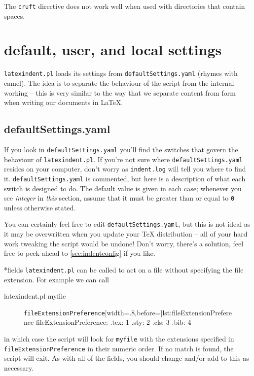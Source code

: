 \documentclass[10pt]{article}
\begin{document}
The \texttt{cruft} directive does not work well when used with
directories that contain spaces.

\section{default, user, and local settings}\label{sec:defuseloc}
\texttt{latexindent.pl} loads its settings from \texttt{defaultSettings.yaml}
(rhymes with camel). The idea is to separate the behaviour of the script
from the internal working -- this is very similar to the way that we separate content
from form when writing our documents in \LaTeX.

\subsection{defaultSettings.yaml}
If you look in \texttt{defaultSettings.yaml} you'll find the switches
that govern the behaviour of \texttt{latexindent.pl}. If you're not sure where
\texttt{defaultSettings.yaml} resides on your computer, don't worry as \texttt{indent.log}
will tell you where to find it.
\texttt{defaultSettings.yaml} is commented,
but here is a description of what each switch is designed to do. The default
value is given in each case; whenever you see \emph{integer} in \emph{this}
section, assume that it must be greater than or equal to \texttt{0} unless
otherwise stated.

You can certainly feel free to edit \texttt{defaultSettings.yaml}, but
this is not ideal as it may be overwritten when you update your \TeX{} distribution --
all of your hard work tweaking the script would be undone! Don't worry,
there's a solution, feel free to peek ahead to \cref{sec:indentconfig} if you like.

*{fields}
\texttt{latexindent.pl} can be called to
act on a file without
specifying the file extension.  For example we can call 
\begin{commandshell}
latexindent.pl myfile
\end{commandshell}
\begin{figure}
\begin{yaml}[firstnumber=23]{\texttt{fileExtensionPreference}}[width=.8\linewidth,before=\centering]{lst:fileExtensionPreference}
fileExtensionPreference:
    .tex: 1
    .sty: 2
    .cls: 3
    .bib: 4
	\end{yaml}
\end{figure}
in which case the script will look for \texttt{myfile} with the extensions
specified in \texttt{fileExtensionPreference} in their numeric order. If
no match is found, the script will exit. As with all of the fields, you should
change and/or add to this as necessary.
\end{document}
